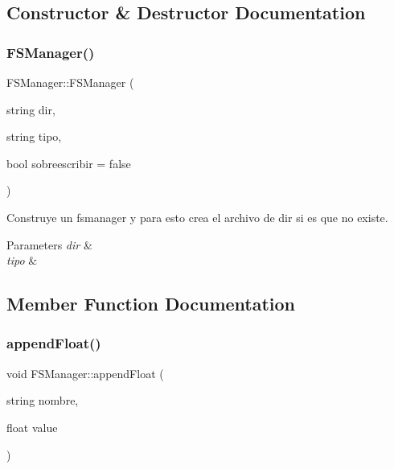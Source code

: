 \subsection{Constructor \& Destructor Documentation}
\mbox{\label{classFSManager_a6332022070523e78abdb3371fdb5befb}} 
\subsubsection{\texorpdfstring{F\+S\+Manager()}{FSManager()}}
{\footnotesize\ttfamily F\+S\+Manager\+::\+F\+S\+Manager (\begin{DoxyParamCaption}\item[{string}]{dir,  }\item[{string}]{tipo,  }\item[{bool}]{sobreescribir = {\ttfamily false} }\end{DoxyParamCaption})\hspace{0.3cm}{\ttfamily [inline]}}



Construye un fsmanager y para esto crea el archivo de \textquotesingle{}dir\textquotesingle{} si es que no existe. 


\begin{DoxyParams}{Parameters}
{\em dir} & \\
\hline
{\em tipo} & \\
\hline
\end{DoxyParams}


\subsection{Member Function Documentation}
\mbox{\label{classFSManager_ae0719c62b330a8053d65fc519f1afb38}} 
\subsubsection{\texorpdfstring{append\+Float()}{appendFloat()}}
{\footnotesize\ttfamily void F\+S\+Manager\+::append\+Float (\begin{DoxyParamCaption}\item[{string}]{nombre,  }\item[{float}]{value }\end{DoxyParamCaption})\hspace{0.3cm}{\ttfamily [inline]}}



